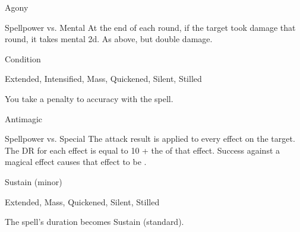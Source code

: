 \begin{spellsection}{Agony}
\begin{spellheader}
\end{spellheader}
\begin{spellcontent}
\begin{spelltargetinginfo}
\end{spelltargetinginfo}
\begin{spelleffects}
\begin{spellattack}{Spellpower vs. Mental}
\spellsuccess At the end of each round, if the target took damage that round, it takes mental  \minus2d.
\spellcritical As above, but double damage.
\end{spellattack}
\spelldur Condition
\end{spelleffects}
\end{spellcontent}
\begin{spellfooter}
 Extended, Intensified, Mass, Quickened, Silent, Stilled
\end{spellfooter}
\begin{spellsubcontent}
\begin{spellcantrip}
You take a  penalty to accuracy with the spell.
\end{spellcantrip}
\end{spellsubcontent}
\end{spellsection}
\begin{spellsection}{Antimagic}
\begin{spellcontent}
\begin{spelltargetinginfo}
\end{spelltargetinginfo}
\begin{spelleffects}
\begin{spellattack}{Spellpower vs. Special}
\spellspecial
The attack result is applied to every  effect on the target.
The DR for each effect is equal to 10 + the  of that effect.
\spellsuccess
Success against a magical effect causes that effect to be .
\end{spellattack}
\spelldur Sustain (minor)
\end{spelleffects}
\end{spellcontent}
\begin{spellfooter}
 Extended, Mass, Quickened, Silent, Stilled
\end{spellfooter}
\begin{spellsubcontent}
\begin{spellcantrip}
The spell's duration becomes Sustain (standard).
\end{spellcantrip}
\end{spellsubcontent}
\end{spellsection}
